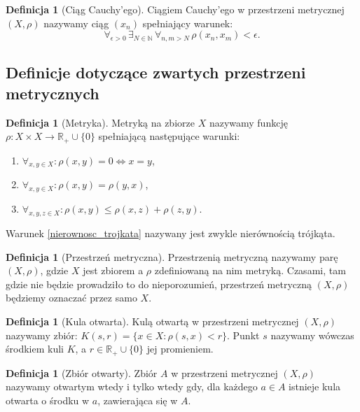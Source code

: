 \documentclass[licencjacka]{pwr_wmat_praca_dyplomowa}
\theoremstyle{plain}
\numberwithin{theorem}{chapter}
\theoremstyle{definition}
\numberwithin{theorem}{chapter}
\newtheorem{definition}[theorem]{Definicja}
\begin{document}
\begin{definition}[Ciąg Cauchy'ego]
Ciągiem Cauchy'ego w przestrzeni metrycznej $(X, \rho)$ nazywamy ciąg $(x_n)$ spełniający warunek:
$$\forall_{\epsilon>0} \, \exists_{N \in \mathbb{N}} \, \forall_{n,m > N} \, \rho(x_n, x_m) < \epsilon.$$
\end{definition}




\subsection{Definicje dotyczące zwartych przestrzeni metrycznych}

\begin{definition}[Metryka]
Metryką na zbiorze $X$ nazywamy funkcję $\rho : X \times X \longrightarrow \mathbb{R}_+ \cup \{0\}$ spełniającą następujące warunki:
\begin{enumerate}
\item $\forall_{x,y \in X}: \rho(x,y)=0 \iff x=y$,
\item $\forall_{x,y \in X}: \rho(x,y) = \rho(y,x)$,
\item \label{nierownosc_trojkata} $\forall_{x,y,z \in X}: \rho(x,y) \leq \rho(x,z) + \rho(z,y)$.
\end{enumerate}
Warunek \ref{nierownosc_trojkata} nazywany jest zwykle nierównością trójkąta.

\end{definition}

\begin{definition}[Przestrzeń metryczna]
Przestrzenią metryczną nazywamy parę $(X, \rho)$, gdzie $X$ jest zbiorem a $\rho$ zdefiniowaną na nim metryką. Czasami, tam gdzie nie będzie prowadziło to do nieporozumień, przestrzeń metryczną $(X, \rho)$ będziemy oznaczać przez samo $X$.
\end{definition}

\begin{definition}[Kula otwarta]
Kulą otwartą w przestrzeni metrycznej $(X, \rho)$ nazywamy zbiór: $K(s, r) = \{x \in X: \rho(s, x) < r\}$.
Punkt $s$ nazywamy wówczas środkiem kuli $K$, a $r \in \mathbb{R}_+ \cup \{0\}$ jej promieniem.
\end{definition}

\begin{definition}[Zbiór otwarty]
Zbiór $A$ w przestrzeni metrycznej $(X, \rho)$ nazywamy otwartym wtedy i tylko wtedy gdy, dla każdego $a \in A$ istnieje kula otwarta o środku w $a$, zawierająca się w $A$.
\end{definition}
\end{document}
